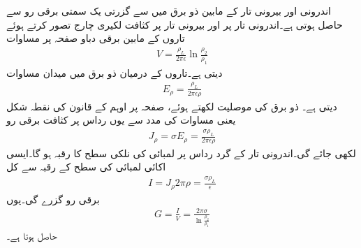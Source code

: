 اندرونی اور بیرونی تار کے مابین ذو برق میں سے گزرتی یک سمتی برقی رو  سے حاصل ہوتی ہے۔اندرونی تار پر  اور بیرونی تار پر  کثافت لکیری چارج تصور کرتے ہوئے تاروں کے مابین برقی دباو صفحہ  پر مساوات 
\begin{align*}
V=\frac{\rho_L}{2\pi \epsilon} \ln \frac{\rho_2}{\rho_1}
\end{align*}
دیتی ہے۔تاروں کے درمیان ذو برق میں میدان مساوات 
\begin{align*}
E_{\rho}=\frac{\rho_L}{2\pi \epsilon \rho}
\end{align*}
دیتی ہے۔ ذو برق کی موصلیت  لکھتے ہوئے، صفحہ  پر اوہم کے قانون کی نقطہ شکل یعنی مساوات  کی مدد سے یوں رداس  پر کثافت  برقی رو
\begin{align*}
J_{\rho}=\sigma E_{\rho}=\frac{\sigma \rho_L}{2\pi \epsilon \rho}
\end{align*}
لکھی جائے گی۔اندرونی تار کے گرد رداس  پر  لمبائی کی نلکی سطح کا رقبہ  ہو گا۔ایسی اکائی لمبائی کی سطح کے رقبہ 
  سے کل
\begin{align*}
I= J_{\rho} 2\pi \rho=\frac{\sigma \rho_L}{\epsilon}
\end{align*}
برقی رو گزرے گی۔یوں
\begin{align}
G=\frac{I}{V}=\frac{2\pi \sigma}{\ln \frac{\rho_2}{\rho_1}}
\end{align}
حاصل ہوتا ہے۔

